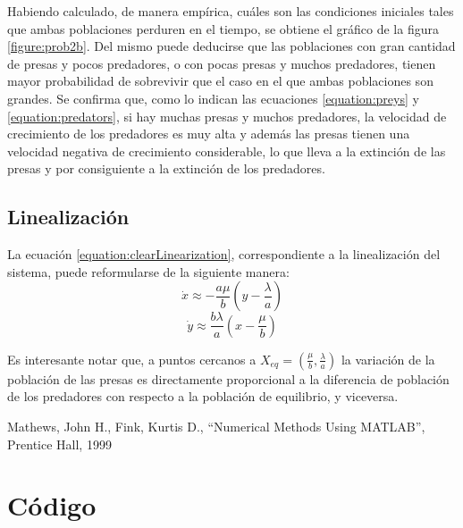 \documentclass[journal, monochrome]{IEEEtran}
\begin{document}
Habiendo calculado, de manera empírica, cuáles son las condiciones iniciales tales que ambas poblaciones perduren en el tiempo, se obtiene el gráfico de la figura \ref{figure:prob2b}. Del mismo puede deducirse que las poblaciones con gran cantidad de presas y pocos predadores, o con pocas presas y muchos predadores, tienen mayor probabilidad de sobrevivir que el caso en el que ambas poblaciones son grandes. Se confirma que, como lo indican las ecuaciones \ref{equation:preys} y \ref{equation:predators}, si hay muchas presas y muchos predadores, la velocidad de crecimiento de los predadores es muy alta y además las presas tienen una velocidad negativa de crecimiento considerable, lo que lleva a la extinción de las presas y por consiguiente a la extinción de los predadores.


\subsection{Linealización}

La ecuación \ref{equation:clearLinearization}, correspondiente a la linealización del sistema, puede reformularse de la siguiente manera:
\begin{equation}
\dot{x} \approx -\frac{a \mu}{b} \left( y - \frac{\lambda}{a}\right)
\label{equation:preysLinear2}
\end{equation}
\begin{equation}
\dot{y} \approx \frac{b \lambda}{a}\left(x - \frac{\mu}{b}\right)
\label{equation:predatorsLinear2}
\end{equation}

Es interesante notar que, a puntos cercanos a $X_{eq} = (\frac{\mu}{b}, \frac{\lambda}{a})$ la variación de la población de las presas es directamente proporcional a la diferencia de población de los predadores con respecto a la población de equilibrio, y viceversa. 


\begin{thebibliography}{1}

	Mathews, John H.,
	Fink, Kurtis D.,
	``Numerical Methods Using MATLAB'',
	Prentice Hall,
	1999
	
\end{thebibliography}



\clearpage
\section{Código}
\end{document}
